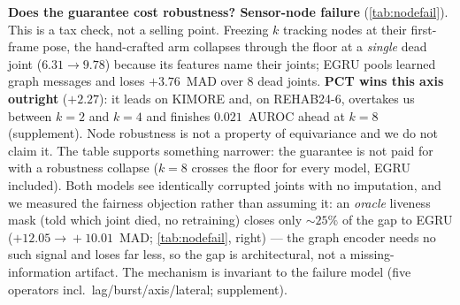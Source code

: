 \documentclass[10pt,twocolumn,letterpaper]{article}
\begin{document}
\textbf{Does the guarantee cost robustness? Sensor-node failure} (\cref{tab:nodefail}). This is a tax
check, not a selling point. Freezing $k$ tracking nodes at their first-frame pose, the hand-crafted arm
collapses through the floor at a \emph{single} dead joint ($6.31\!\to\!9.78$) because its features name
their joints; EGRU pools learned graph messages and loses $+3.76$~MAD over $8$ dead joints.
\textbf{PCT wins this axis outright} ($+2.27$): it leads on KIMORE and, on REHAB24-6, overtakes us
between $k{=}2$ and $k{=}4$ and finishes $0.021$~AUROC ahead at $k{=}8$ (supplement). Node robustness is
not a property of equivariance and we do not claim it. The table supports something narrower: the
guarantee is not paid for with a robustness collapse ($k{=}8$ crosses the floor for every model, EGRU
included). Both models see identically corrupted joints with no imputation, and we measured the
fairness objection rather than assuming it: an \emph{oracle} liveness mask (told which joint died, no
retraining) closes only $\sim\!25\%$ of the gap to EGRU ($+12.05\!\to\!+10.01$~MAD; \cref{tab:nodefail},
right) --- the graph encoder needs no such signal and loses far less, so the gap is architectural, not
a missing-information artifact. The mechanism is invariant to the failure model (five operators incl.\
lag/burst/axis/lateral; supplement).

\begin{table}[t]\centering\small
\setlength{\tabcolsep}{4pt}
\caption{Sensor-node failure: MAD as $k$ nodes freeze (mean over 3 seeds $\times$ 5 folds; identical
hash-locked inputs; no retraining). \underline{Underline}: past the floor ($8.31$). ``+oracle'':
InvariantGRU given an oracle liveness mask (same checkpoint; features touching the dead joint zeroed
at inference) --- the measured fairness control.}
\label{tab:nodefail}
\end{table}
\end{document}
